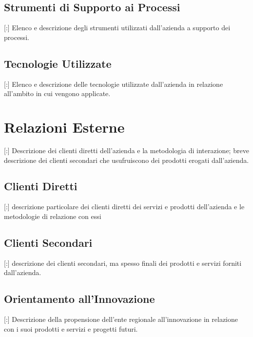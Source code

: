 \subsection{Strumenti di Supporto ai Processi}

[:] Elenco e descrizione degli strumenti utilizzati dall'azienda a supporto dei processi.

\subsection{Tecnologie Utilizzate}

[:] Elenco e descrizione delle tecnologie utilizzate dall'azienda in relazione all'ambito in cui vengono applicate.

\section{Relazioni Esterne}

[:] Descrizione dei clienti diretti dell'azienda e la metodologia di interazione; breve descrizione dei clienti secondari che usufruiscono dei prodotti erogati dall'azienda.

\subsection{Clienti Diretti}

[:]  descrizione particolare dei clienti diretti dei servizi e prodotti dell'azienda e le metodologie di relazione con essi

\subsection{Clienti Secondari}

[:] descrizione dei clienti secondari, ma spesso finali dei prodotti e servizi forniti dall'azienda.

\subsection{Orientamento all'Innovazione}

[:] Descrizione della propensione dell'ente regionale all'innovazione in relazione con i suoi prodotti e servizi e progetti futuri.

